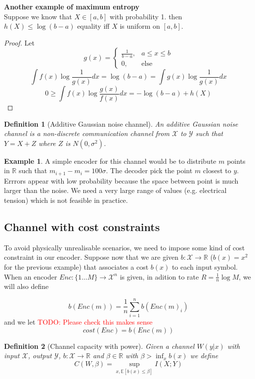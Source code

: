 \documentclass[twoside]{article}
\newtheorem{definition}{Definition}[section]
\theoremstyle{definition} %
\newtheorem{example}{Example}
\newcommand{\todo}[1]{\textcolor{red}{TODO: #1}}
\newcommand{\Ex}[1]{\mathbb{E}\left[#1\right]}
\def\X{\mathcal{X}}
\def\Y{\mathcal{Y}}
\def\R{\mathbb{R}}
\begin{document}
\textbf{Another example of maximum entropy} \\
Suppose we know that $X \in [a, b]$ with probability 1. then $h(X) \leq \log(b - a)$ equality iff $X$ is uniform on $[a, b]$.
\begin{proof}
  Let
  \[
    g(x) =
    \left\{
    \begin{array}{cc}
      \frac{1}{b - a} , & a \leq x \leq b \\
      0 , & \text{else}
    \end{array}
    \right.
\]
\[
  \int f(x) \log \frac{1}{g(x)} dx = \log(b - a) = \int g(x) \log \frac{1}{g(x)} dx
\]
\[
  0 \geq \int f(x) \log \frac{g(x)}{f(x)} dx = - \log(b - a) + h(X)
\]
\end{proof}


\begin{definition}[Additive Gaussian noise channel]
  An additive Gaussian noise channel is a non-discrete communication channel from $\X$ to $\Y$ such that $Y=X+Z$ where $Z$ is $N(0,\sigma^2)$.
\end{definition}

\begin{example}
  A simple encoder for this channel would be to distribute $m$ points in $\R$ such that $m_{i+1} - m_i = 100\sigma$. The decoder pick the point $m$ closest to $y$. Errrors appear with low probability because the space between point is much larger than the noise. We need a very large range of values (e.g. electrical tension) which is not feasible in practice.
\end{example}

\subsection{Channel with cost constraints}

To avoid physically unrealisable scenarios, we need to impose some kind of cost constraint in our encoder. Suppose now that we are given $b : \X \to \R$ ($b(x) = x^2$ for the previous example) that associates a cost $b(x)$ to each input symbol. When an encoder $Enc: \{ 1 \dots M \} \to \X^n$ is given, in adition to rate $R = \frac 1 n \log M$, we will also define

\[
  b(Enc(m)) = \frac 1 n \sum_{i=1}^n b(Enc(m)_i)
\]
and we let
\todo{Please check this makes sense}
\[
  cost(Enc) = b(Enc(m))
\]

\begin{definition}[Channel capacity with power]
Given a channel $W(y|x)$ with input $\X$, output $\Y$, $b:\X\to \R$ and $\beta \in \R$ with $\beta > \inf_x b(x)$ we define
\[
  C(W, \beta) = \sup_{x, \Ex{b(x) \leq \beta}} I(X;Y)
\]
\end{definition}
\end{document}
